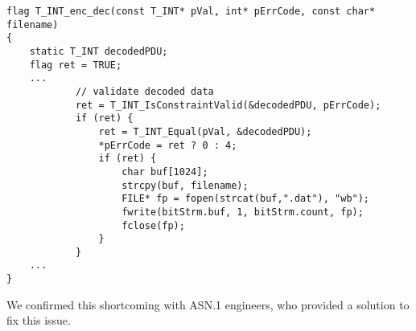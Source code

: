 \begin{lstlisting}[style=CStyle, caption=ASN.1 test code., label=test_code]
flag T_INT_enc_dec(const T_INT* pVal, int* pErrCode, const char* filename)
{
    static T_INT decodedPDU;
    flag ret = TRUE;
    ...
            // validate decoded data
            ret = T_INT_IsConstraintValid(&decodedPDU, pErrCode); 
            if (ret) {
                ret = T_INT_Equal(pVal, &decodedPDU);
                *pErrCode = ret ? 0 : 4;
                if (ret) {
                    char buf[1024];
                    strcpy(buf, filename);
                    FILE* fp = fopen(strcat(buf,".dat"), "wb");
                    fwrite(bitStrm.buf, 1, bitStrm.count, fp);
                    fclose(fp);
                }
            }
    ...
}
\end{lstlisting}

We confirmed this shortcoming with ASN.1 engineers, who provided a solution to fix this issue.